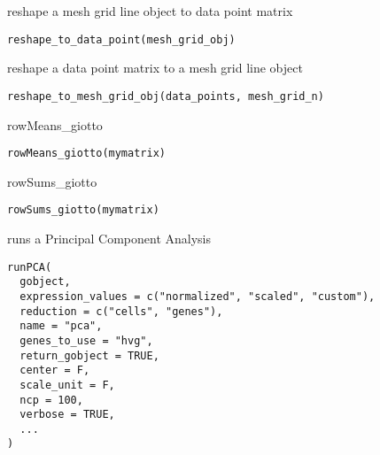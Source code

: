 \documentclass[a4paper]{book}
\begin{document}
%
\begin{Description}\relax
reshape a mesh grid line object to data point matrix
\end{Description}
%
\begin{Usage}
\begin{verbatim}
reshape_to_data_point(mesh_grid_obj)
\end{verbatim}
\end{Usage}
%
\begin{Description}\relax
reshape a data point matrix to a mesh grid line object
\end{Description}
%
\begin{Usage}
\begin{verbatim}
reshape_to_mesh_grid_obj(data_points, mesh_grid_n)
\end{verbatim}
\end{Usage}
%
\begin{Description}\relax
rowMeans\_giotto
\end{Description}
%
\begin{Usage}
\begin{verbatim}
rowMeans_giotto(mymatrix)
\end{verbatim}
\end{Usage}
%
\begin{Description}\relax
rowSums\_giotto
\end{Description}
%
\begin{Usage}
\begin{verbatim}
rowSums_giotto(mymatrix)
\end{verbatim}
\end{Usage}
%
\begin{Description}\relax
runs a Principal Component Analysis
\end{Description}
%
\begin{Usage}
\begin{verbatim}
runPCA(
  gobject,
  expression_values = c("normalized", "scaled", "custom"),
  reduction = c("cells", "genes"),
  name = "pca",
  genes_to_use = "hvg",
  return_gobject = TRUE,
  center = F,
  scale_unit = F,
  ncp = 100,
  verbose = TRUE,
  ...
)
\end{verbatim}
\end{Usage}
\end{document}
